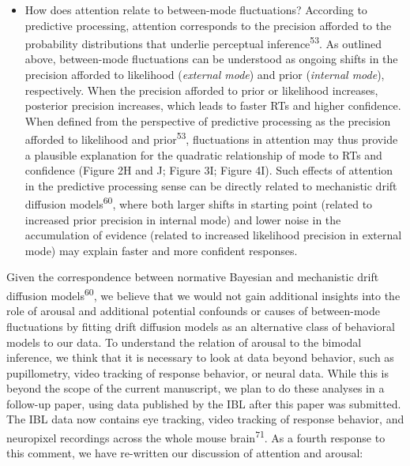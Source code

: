 \documentclass[
]{article}
\providecommand{\tightlist}{%
  \setlength{\itemsep}{0pt}\setlength{\parskip}{0pt}}
\begin{document}
\begin{itemize}
\tightlist
\item
  How does attention relate to between-mode fluctuations? According to
  predictive processing, attention corresponds to the precision afforded
  to the probability distributions that underlie perceptual
  inference\textsuperscript{53}. As outlined above, between-mode
  fluctuations can be understood as ongoing shifts in the precision
  afforded to likelihood (\emph{external mode}) and prior
  (\emph{internal mode}), respectively. When the precision afforded to
  prior or likelihood increases, posterior precision increases, which
  leads to faster RTs and higher confidence. When defined from the
  perspective of predictive processing as the precision afforded to
  likelihood and prior\textsuperscript{53}, fluctuations in attention
  may thus provide a plausible explanation for the quadratic
  relationship of mode to RTs and confidence (Figure 2H and J; Figure
  3I; Figure 4I). Such effects of attention in the predictive processing
  sense can be directly related to mechanistic drift diffusion
  models\textsuperscript{60}, where both larger shifts in starting point
  (related to increased prior precision in internal mode) and lower
  noise in the accumulation of evidence (related to increased likelihood
  precision in external mode) may explain faster and more confident
  responses.
\end{itemize}

Given the correspondence between normative Bayesian and mechanistic
drift diffusion models\textsuperscript{60}, we believe that we would not
gain additional insights into the role of arousal and additional
potential confounds or causes of between-mode fluctuations by fitting
drift diffusion models as an alternative class of behavioral models to
our data. To understand the relation of arousal to the bimodal
inference, we think that it is necessary to look at data beyond
behavior, such as pupillometry, video tracking of response behavior, or
neural data. While this is beyond the scope of the current manuscript,
we plan to do these analyses in a follow-up paper, using data published
by the IBL after this paper was submitted. The IBL data now contains eye
tracking, video tracking of response behavior, and neuropixel recordings
across the whole mouse brain\textsuperscript{71}. As a fourth response
to this comment, we have re-written our discussion of attention and
arousal:
\end{document}
